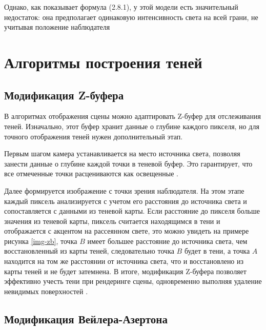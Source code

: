 Однако, как показывает формула (2.8.1), у этой модели есть значительный недостаток: она предполагает одинаковую интенсивность света на всей грани, не учитывая положение наблюдателя

\section{Алгоритмы построения теней}


\subsection{Модификация  Z-буфера}
В алгоритмах отображения сцены можно адаптировать Z-буфер для отслеживания теней. Изначально, этот буфер хранит данные о глубине каждого пикселя, но для точного отображения теней нужен дополнительный этап.





Первым шагом камера устанавливается на место источника света, позволяя занести данные о глубине каждой точки в теневой буфер. Это гарантирует, что все отмеченные точки расцениваются как освещенные \cite{letion}.

Далее формируется изображение с точки зрения наблюдателя. На этом этапе каждый пиксель анализируется с учетом его расстояния до источника света и сопоставляется с данными из теневой карты. Если расстояние до пикселя больше значения из теневой карты, пиксель считается находящимся в тени и отображается с акцентом на рассеянном свете, это можно увидеть на примере рисунка \ref{img-zb}, точка $ B $ имеет большее расстояние до источника света, чем восстановленный из карты теней, следовательно точка $ B $ будет в тени, а точка $ A $  находится на том же расстоянии от источника света, что и восстановлено из карты теней и не будет затемнена. В итоге, модификация Z-буфера позволяет эффективно учесть тени при рендеринге сцены, одновременно выполняя удаление невидимых поверхностей \cite{letion}.







\subsection{Модификация Вейлера-Азертона}


